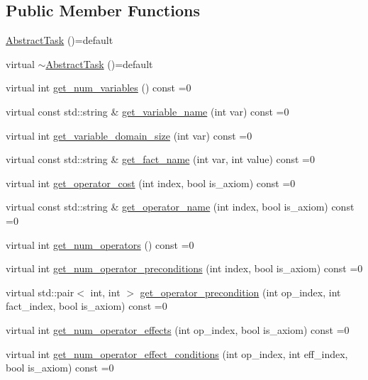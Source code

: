 \subsection*{Public Member Functions}
\begin{DoxyCompactItemize}
\item 
\hyperlink{classAbstractTask_a411b1b5beabae23f37f56cba1305a367}{Abstract\-Task} ()=default
\item 
virtual \hyperlink{classAbstractTask_a19d64eac973cb3521d861369737dd383}{$\sim$\-Abstract\-Task} ()=default
\item 
virtual int \hyperlink{classAbstractTask_ab0f878648c015fb918567403e80d4e4b}{get\-\_\-num\-\_\-variables} () const =0
\item 
virtual const std\-::string \& \hyperlink{classAbstractTask_acf846013bb556a5d5169b13a6bb879a5}{get\-\_\-variable\-\_\-name} (int var) const =0
\item 
virtual int \hyperlink{classAbstractTask_a8f229a999a431a27c75daad6bb86474e}{get\-\_\-variable\-\_\-domain\-\_\-size} (int var) const =0
\item 
virtual const std\-::string \& \hyperlink{classAbstractTask_a8ad9d3e97f1aa8fcde6cbc7844609c79}{get\-\_\-fact\-\_\-name} (int var, int value) const =0
\item 
virtual int \hyperlink{classAbstractTask_aeeb845c0f21bb3517d2ed79c8fdbf575}{get\-\_\-operator\-\_\-cost} (int index, bool is\-\_\-axiom) const =0
\item 
virtual const std\-::string \& \hyperlink{classAbstractTask_a528cea78d19468e616b2936aba22ea64}{get\-\_\-operator\-\_\-name} (int index, bool is\-\_\-axiom) const =0
\item 
virtual int \hyperlink{classAbstractTask_a616388eda808179e2dafcf8030348732}{get\-\_\-num\-\_\-operators} () const =0
\item 
virtual int \hyperlink{classAbstractTask_a2913e3d94adf9ce73ecf93a76efd64c0}{get\-\_\-num\-\_\-operator\-\_\-preconditions} (int index, bool is\-\_\-axiom) const =0
\item 
virtual std\-::pair$<$ int, int $>$ \hyperlink{classAbstractTask_a6d089445ffef1e87abdf2f989c275402}{get\-\_\-operator\-\_\-precondition} (int op\-\_\-index, int fact\-\_\-index, bool is\-\_\-axiom) const =0
\item 
virtual int \hyperlink{classAbstractTask_a101be8c121199154315a3539e59796b2}{get\-\_\-num\-\_\-operator\-\_\-effects} (int op\-\_\-index, bool is\-\_\-axiom) const =0
\item 
virtual int \hyperlink{classAbstractTask_a41642ad827682428ba1c099ecbde18ae}{get\-\_\-num\-\_\-operator\-\_\-effect\-\_\-conditions} (int op\-\_\-index, int eff\-\_\-index, bool is\-\_\-axiom) const =0

\end{DoxyCompactItemize}
